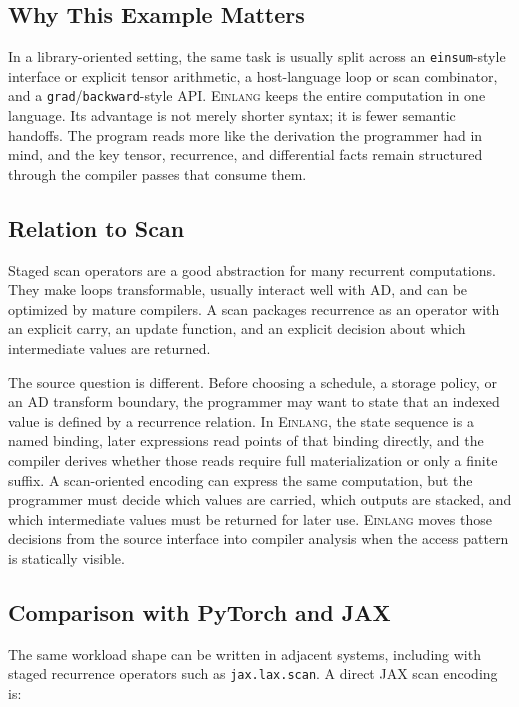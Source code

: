 \documentclass[sigplan,screen,nonacm]{acmart}
\newcommand{\einlang}{\textsc{Einlang}}
\begin{document}
\subsection{Why This Example Matters}

In a library-oriented setting, the same task is usually split across an \texttt{einsum}-style interface or explicit tensor arithmetic, a host-language loop or scan combinator, and a \texttt{grad}/\texttt{backward}-style API. \einlang{} keeps the entire computation in one language. Its advantage is not merely shorter syntax; it is fewer semantic handoffs. The program reads more like the derivation the programmer had in mind, and the key tensor, recurrence, and differential facts remain structured through the compiler passes that consume them.

\subsection{Relation to Scan}

Staged scan operators are a good abstraction for many recurrent computations. They make loops transformable, usually interact well with AD, and can be optimized by mature compilers. A scan packages recurrence as an operator with an explicit carry, an update function, and an explicit decision about which intermediate values are returned.

The source question is different. Before choosing a schedule, a storage policy, or an AD transform boundary, the programmer may want to state that an indexed value is defined by a recurrence relation. In \einlang{}, the state sequence is a named binding, later expressions read points of that binding directly, and the compiler derives whether those reads require full materialization or only a finite suffix. A scan-oriented encoding can express the same computation, but the programmer must decide which values are carried, which outputs are stacked, and which intermediate values must be returned for later use. \einlang{} moves those decisions from the source interface into compiler analysis when the access pattern is statically visible.

\subsection{Comparison with PyTorch and JAX}

The same workload shape can be written in adjacent systems, including with staged recurrence operators such as \texttt{jax.lax.scan}. A direct JAX scan encoding is:
\end{document}
